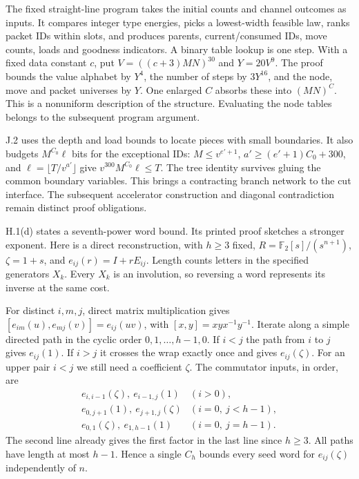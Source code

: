 The fixed straight-line program takes the initial counts and channel outcomes as inputs. It compares integer type energies, picks a lowest-width feasible law, ranks packet IDs within slots, and produces parents, current/consumed IDs, move counts, loads and goodness indicators. A binary table lookup is one step. With a fixed data constant $c$, put $V=((c+3)MN)^{30}$ and $Y=20V^9$. The proof bounds the value alphabet by $Y^4$, the number of steps by $3Y^{16}$, and the node, move and packet universes by $Y$. One enlarged $C$ absorbs these into $(MN)^C$. This is a nonuniform description of the structure. Evaluating the node tables belongs to the subsequent program argument.

J.2 uses the depth and load bounds to locate pieces with small boundaries. It also budgets $M^{C_0}\ell$ bits for the exceptional IDs: $M\le v^{e'+1}$, $a'\ge(e'+1)C_0+300$, and $\ell=\lfloor T/v^{a'}\rfloor$ give $v^{300}M^{C_0}\ell\le T$. The tree identity survives gluing the common boundary variables. This brings a contracting branch network to the cut interface. The subsequent accelerator construction and diagonal contradiction remain distinct proof obligations.


\newpage
{}
H.1(d) states a seventh-power word bound. Its printed proof sketches a stronger exponent. Here is a direct reconstruction, with $h\ge3$ fixed, $R=\mathbb F_2[s]/(s^{n+1})$, $\zeta=1+s$, and $e_{ij}(r)=I+rE_{ij}$. Length counts letters in the specified generators $X_k$. Every $X_k$ is an involution, so reversing a word represents its inverse at the same cost.

For distinct $i,m,j$, direct matrix multiplication gives $[e_{im}(u),e_{mj}(v)]=e_{ij}(uv)$, with $[x,y]=xyx^{-1}y^{-1}$. Iterate along a simple directed path in the cyclic order $0,1,\ldots,h-1,0$. If $i<j$ the path from $i$ to $j$ gives $e_{ij}(1)$. If $i>j$ it crosses the wrap exactly once and gives $e_{ij}(\zeta)$. For an upper pair $i<j$ we still need a coefficient $\zeta$. The commutator inputs, in order, are
\[
\begin{array}{ll}
 e_{i,i-1}(\zeta),\ e_{i-1,j}(1) & (i>0),\\
 e_{0,j+1}(1),\ e_{j+1,j}(\zeta) & (i=0,\ j<h-1),\\
 e_{0,1}(\zeta),\ e_{1,h-1}(1) & (i=0,\ j=h-1).
\end{array}
\]
The second line already gives the first factor in the last line since $h\ge3$. All paths have length at most $h-1$. Hence a single $C_h$ bounds every seed word for $e_{ij}(\zeta)$ independently of $n$.

